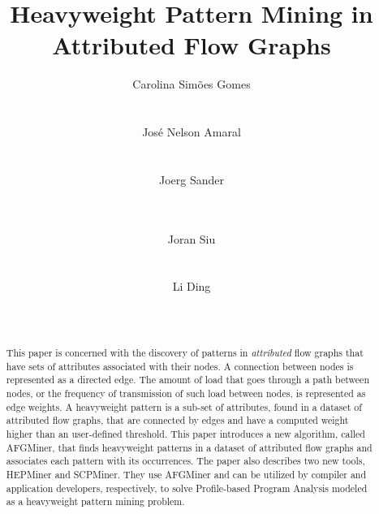 \documentclass{acm_proc_article-sp}
\begin{document}
\title{Heavyweight Pattern Mining in Attributed Flow Graphs} 
\
\author{
\alignauthor
Carolina Sim\~oes Gomes\\
       \\
       \\
\alignauthor
Jos\'e Nelson Amaral\\
       \\
       \\
\alignauthor
Joerg Sander\\
       \\
       \\
\and
\alignauthor 
Joran Siu\\
       \\
       \\
\alignauthor 
Li Ding\\
       \\
       \\
}

\maketitle
\begin{abstract}
This paper is concerned with the discovery of patterns in {\em attributed} flow graphs that have sets of attributes associated with their nodes. A connection between nodes is represented as a directed edge. The amount of load that goes through a path between nodes, or the frequency of transmission of such load between nodes, is represented as edge weights. A heavyweight pattern is a sub-set of attributes, found in a dataset of attributed flow graphs, that are connected by edges and have a computed weight higher than an user-defined threshold. This paper introduces a new algorithm, called AFGMiner, that finds heavyweight patterns in a dataset of attributed flow graphs and associates each pattern with its occurrences. The paper also describes two new tools, HEPMiner and SCPMiner. They use AFGMiner and can be utilized by compiler and application developers, respectively, to solve Profile-based Program Analysis modeled as a heavyweight pattern mining problem.
\end{abstract}
\end{document}
